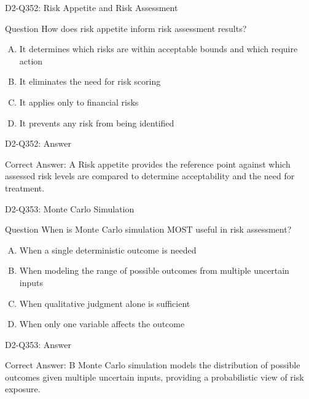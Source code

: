 \documentclass{beamer}
\begin{document}
\begin{frame}{D2-Q352: Risk Appetite and Risk Assessment}
	\begin{block}{Question}
		How does risk appetite inform risk assessment results?
	\end{block}
	\begin{enumerate}[(A)]
		\item It determines which risks are within acceptable bounds and which require action
		\item It eliminates the need for risk scoring
		\item It applies only to financial risks
		\item It prevents any risk from being identified
	\end{enumerate}
\end{frame}
\begin{frame}{D2-Q352: Answer}
	\begin{block}{Correct Answer: A}
		Risk appetite provides the reference point against which assessed risk levels are compared to determine acceptability and the need for treatment.
	\end{block}
\end{frame}

\begin{frame}{D2-Q353: Monte Carlo Simulation}
	\begin{block}{Question}
		When is Monte Carlo simulation MOST useful in risk assessment?
	\end{block}
	\begin{enumerate}[(A)]
		\item When a single deterministic outcome is needed
		\item When modeling the range of possible outcomes from multiple uncertain inputs
		\item When qualitative judgment alone is sufficient
		\item When only one variable affects the outcome
	\end{enumerate}
\end{frame}
\begin{frame}{D2-Q353: Answer}
	\begin{block}{Correct Answer: B}
		Monte Carlo simulation models the distribution of possible outcomes given multiple uncertain inputs, providing a probabilistic view of risk exposure.
	\end{block}
\end{frame}
\end{document}
